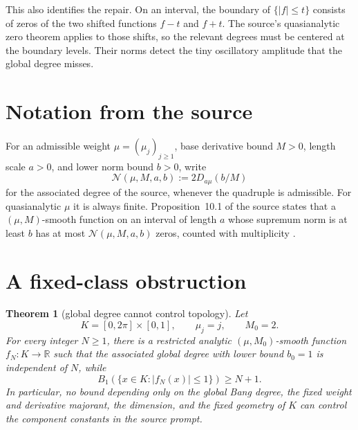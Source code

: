 \documentclass[11pt]{article}
\newtheorem{theorem}{Theorem}
\newcommand{\R}{\mathbb R}
\begin{document}
This also identifies the repair.  On an interval, the boundary of
$\{|f|\le t\}$ consists of zeros of the two shifted functions $f-t$ and
$f+t$.  The source's quasianalytic zero theorem applies to those shifts, so the
relevant degrees must be centered at the boundary levels.  Their norms detect
the tiny oscillatory amplitude that the global degree misses.

\section{Notation from the source}

For an admissible weight $\mu=(\mu_j)_{j\ge1}$, base derivative bound $M>0$,
length scale $a>0$, and lower norm bound $b>0$, write
\[
 \mathcal N(\mu,M,a,b)
 :=2D_{a\mu}(b/M)
\]
for the associated degree of the source, whenever the quadruple is admissible.
For quasianalytic $\mu$ it is always finite.  Proposition~10.1 of the source
states that a $(\mu,M)$-smooth function on an interval of length $a$ whose
supremum norm is at least $b$ has at most
$\mathcal N(\mu,M,a,b)$ zeros, counted with multiplicity
\cite[Proposition~10.1]{Rainer}.

\section{A fixed-class obstruction}

\begin{theorem}[global degree cannot control topology]\label{thm:negative}
Let
\[
 K=[0,2\pi]\times[0,1],\qquad \mu_j=j,\qquad M_0=2.
\]
For every integer $N\ge1$, there is a restricted analytic
$(\mu,M_0)$-smooth function $f_N:K\to\R$ such that the associated global
degree with lower bound $b_0=1$ is independent of $N$, while
\[
 B_1(\{x\in K:|f_N(x)|\le1\})\ge N+1.
\]
In particular, no bound depending only on the global Bang degree, the fixed
weight and derivative majorant, the dimension, and the fixed geometry of $K$
can control the component constants in the source prompt.
\end{theorem}
\end{document}
